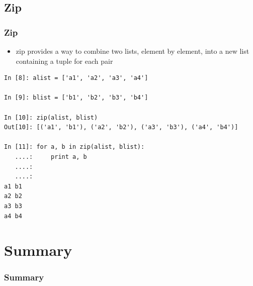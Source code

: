 \documentclass{beamer}
\begin{document}
\subsection{Zip}
\begin{frame}[fragile]
\frametitle{Zip}
\begin{itemize}
\item zip provides a way to combine two lists, element by element, into a new list containing a tuple for each pair
\end{itemize}
\begin{lstlisting}
In [8]: alist = ['a1', 'a2', 'a3', 'a4']

In [9]: blist = ['b1', 'b2', 'b3', 'b4']

In [10]: zip(alist, blist)
Out[10]: [('a1', 'b1'), ('a2', 'b2'), ('a3', 'b3'), ('a4', 'b4')]

In [11]: for a, b in zip(alist, blist):
   ....:     print a, b
   ....:
   ....:
a1 b1
a2 b2
a3 b3
a4 b4
\end{lstlisting}
\end{frame}

\section{Summary}
\begin{frame}[fragile]
\frametitle{Summary}
\end{frame}
\end{document}
